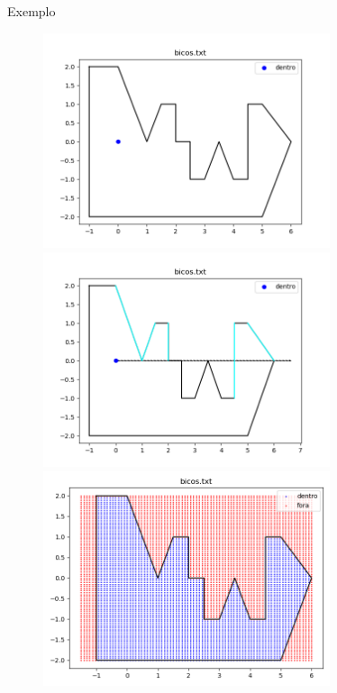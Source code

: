 \documentclass[aspectratio=169,usenames,dvipsnames]{beamer}
\begin{document}
\begin{frame}{Exemplo}
  \begin{center}
    \begin{figure}
      \begin{overprint}
        \includegraphics[width=0.75\textwidth]{figures/bicos.png}
        \includegraphics[width=0.75\textwidth]{figures/bicos_marcados.png}
        \includegraphics[width=0.75\textwidth]{figures/bicos_grid.png}
      \end{overprint}
    \end{figure}
  \end{center}
\end{frame}
\end{document}
